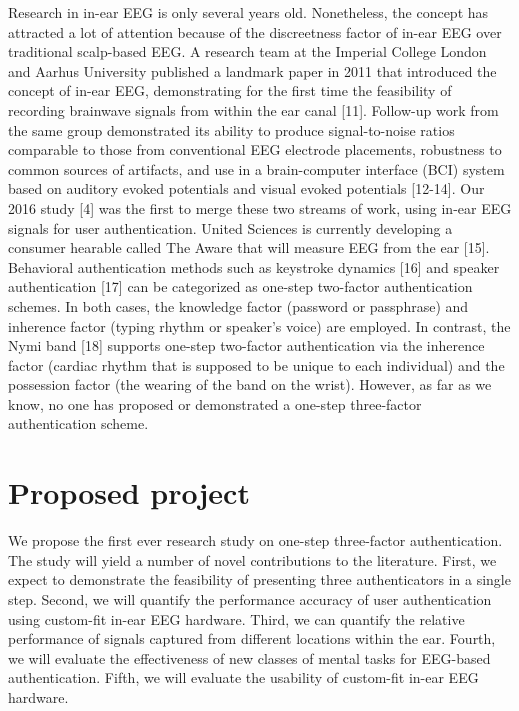 \documentclass[11pt]{article}
\begin{document}
Research in in-ear EEG is only several years old. Nonetheless, the concept has
attracted a lot of attention because of the discreetness factor of in-ear EEG over
traditional scalp-based EEG. A research team at the Imperial College London
and Aarhus University published a landmark paper in 2011 that introduced the
concept of in-ear EEG, demonstrating for the first time the feasibility of recording
brainwave signals from within the ear canal [11]. Follow-up work from the same
group demonstrated its ability to produce signal-to-noise ratios comparable to
those from conventional EEG electrode placements, robustness to common
sources of artifacts, and use in a brain-computer interface (BCI) system based on
auditory evoked potentials and visual evoked potentials [12-14]. Our 2016 study
[4] was the first to merge these two streams of work, using in-ear EEG signals for
user authentication. United Sciences is currently developing a consumer
hearable called The Aware that will measure EEG from the ear [15].
Behavioral authentication methods such as keystroke dynamics [16] and speaker
authentication [17] can be categorized as one-step two-factor authentication
schemes. In both cases, the knowledge factor (password or passphrase) and
inherence factor (typing rhythm or speaker’s voice) are employed. In contrast, the
Nymi band [18] supports one-step two-factor authentication via the inherence
factor (cardiac rhythm that is supposed to be unique to each individual) and the
possession factor (the wearing of the band on the wrist). However, as far as we
know, no one has proposed or demonstrated a one-step three-factor
authentication scheme.

\section{Proposed project}
\label{sec:orge060800}

We propose the first ever research study on one-step three-factor authentication.
The study will yield a number of novel contributions to the literature. First, we
expect to demonstrate the feasibility of presenting three authenticators in a single
step. Second, we will quantify the performance accuracy of user authentication
using custom-fit in-ear EEG hardware. Third, we can quantify the relative
performance of signals captured from different locations within the ear. Fourth,
we will evaluate the effectiveness of new classes of mental tasks for EEG-based
authentication. Fifth, we will evaluate the usability of custom-fit in-ear EEG
hardware.
\end{document}
